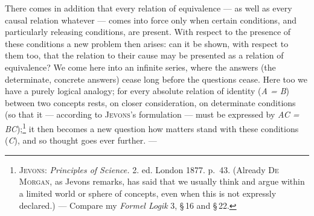 \documentclass[12pt,a4paper]{book}
\newcommand{\opage}[1]{\marginnote{\footnotesize\textit{[#1]}}}
\begin{document}
There comes in addition that every relation of equivalence --- as well as every
causal relation whatever --- comes into force only when certain conditions, and
particularly releasing conditions, are present. With respect to the presence of
these conditions a new problem then arises: can it be shown, with respect to them
too, that the relation to their cause may be presented as a relation of
equivalence? We come here into an infinite series, where the answers (the
determinate, concrete answers) cease long before the questions cease. Here too we
have a purely logical analogy; for every absolute relation of identity
(\textit{A = B}) between two \opage{48}concepts rests, on closer consideration, on
determinate conditions (so that it --- according to \textsc{Jevons}'s
formulation --- must be expressed by \textit{AC = BC});\footnote{\textsc{Jevons}:
\textit{Principles of Science.} 2. ed. London 1877. p.~43. (Already
\textsc{De Morgan}, as Jevons remarks, has said that we usually think and argue
within a limited world or sphere of concepts, even when this is not expressly
declared.) --- Compare my \textit{Formel Logik} 3, \S\,16 and \S\,22.} it then
becomes a new question how matters stand with these conditions (\textit{C}), and
so thought goes ever further. ---
\end{document}
